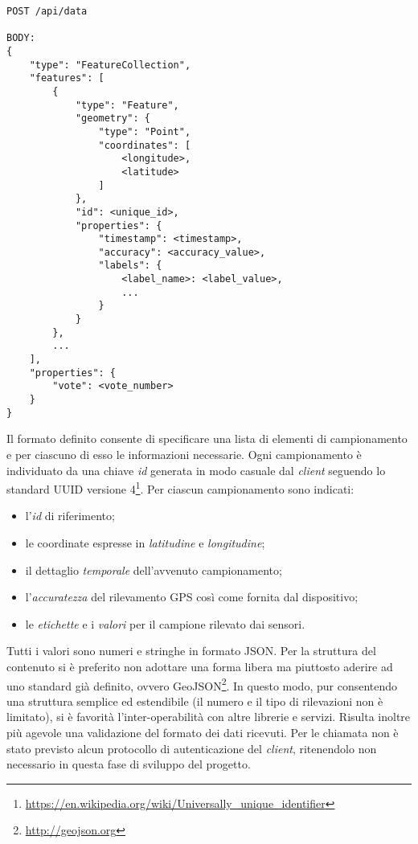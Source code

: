 \begin{lstlisting}[caption=Invocazione API di invio dati,label=response-data]
POST /api/data

BODY: 
{
    "type": "FeatureCollection",
    "features": [
        {
            "type": "Feature",
            "geometry": {
                "type": "Point",
                "coordinates": [
                    <longitude>,
                    <latitude>
                ]
            },
            "id": <unique_id>,
            "properties": {
                "timestamp": <timestamp>,
                "accuracy": <accuracy_value>,
                "labels": {
                    <label_name>: <label_value>,
                    ...
                }
            }
        },
        ...
    ],
    "properties": {
        "vote": <vote_number>
    }
}
\end{lstlisting}
 Il formato definito consente di specificare una lista di elementi di campionamento e per ciascuno di esso le informazioni necessarie. Ogni campionamento è individuato da una chiave \emph{id} generata in modo casuale dal \emph{client} seguendo lo standard UUID versione 4\footnote{\url{https://en.wikipedia.org/wiki/Universally_unique_identifier}}. Per ciascun campionamento sono indicati:
\begin{itemize}
	\item l'\emph{id} di riferimento;
	\item le coordinate espresse in \emph{latitudine} e \emph{longitudine};
	\item il dettaglio \emph{temporale} dell'avvenuto campionamento;
	\item l'\emph{accuratezza} del rilevamento GPS così come fornita dal dispositivo;
	\item le \emph{etichette} e i \emph{valori} per il campione rilevato dai sensori.
\end{itemize}
Tutti i valori sono numeri e stringhe in formato JSON. Per la struttura del contenuto si è preferito non adottare una forma libera ma piuttosto aderire ad uno standard già definito, ovvero GeoJSON\footnote{\url{http://geojson.org}}. In questo modo, pur consentendo una struttura semplice ed estendibile (il numero e il tipo di rilevazioni non è limitato), si è favorità l'inter-operabilità con altre librerie e servizi. Risulta inoltre più agevole una validazione del formato dei dati ricevuti.
Per le chiamata non è stato previsto alcun protocollo di autenticazione del \emph{client}, ritenendolo non necessario in questa fase di sviluppo del progetto.

